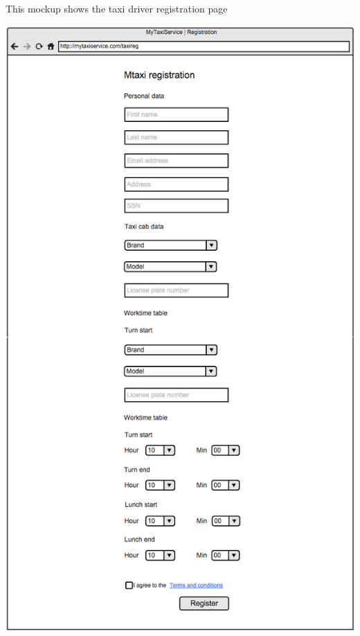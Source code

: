 \documentclass[11pt,titlepage]{article} %
\begin{document}
        \noindent
        This  mockup shows the taxi driver registration page\newline
        \newline
        \begin{center}
        \includegraphics[scale=0.40]{taxiRegInt.png}\newline
        \end{center}
        \newpage
\end{document}
